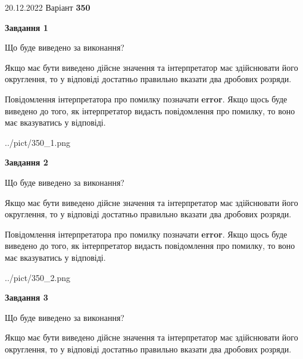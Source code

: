 \documentclass[12pt, ukrainian]{article}
\begin{document}
{20.12.2022 Варіант \No \textbf { 350 }\par}
{
\begin {Large}

{\begin {center}\textbf{Завдання 1}\end {center}}\par
Що буде виведено за виконання? \par

Якщо має бути виведено дійсне значення та інтерпретатор має здійснювати його округлення, 
то у відповіді достатньо правильно вказати два дробових розряди.

Повідомлення інтерпретатора про помилку позначати \textbf{error}.
Якщо щось буде виведено до того, як інтерпретатор видасть повідомлення про помилку, 
то воно має вказуватись у відповіді. \par

\begin{center}
	{../pict/350_1.png}
\end{center}
\newpage

{\begin {center}\textbf{Завдання 2}\end {center}}\par
Що буде виведено за виконання? \par

Якщо має бути виведено дійсне значення та інтерпретатор має здійснювати його округлення, 
то у відповіді достатньо правильно вказати два дробових розряди.

Повідомлення інтерпретатора про помилку позначати \textbf{error}.
Якщо щось буде виведено до того, як інтерпретатор видасть повідомлення про помилку, 
то воно має вказуватись у відповіді. \par

\begin{center}
	{../pict/350_2.png}
\end{center}
\newpage

{\begin {center}\textbf{Завдання 3}\end {center}}\par
Що буде виведено за виконання? \par

Якщо має бути виведено дійсне значення та інтерпретатор має здійснювати його округлення, 
то у відповіді достатньо правильно вказати два дробових розряди.


\end{Large}}
\end{document}
